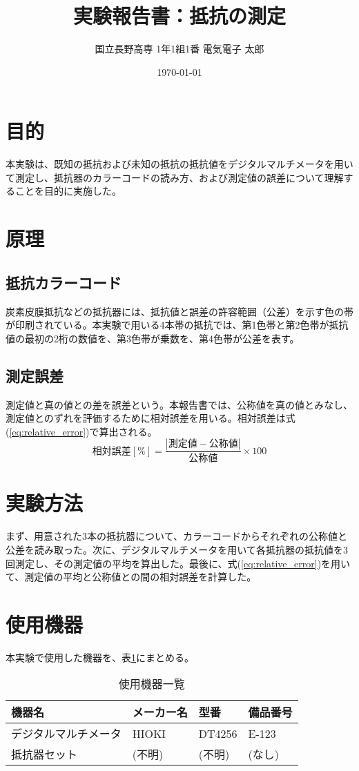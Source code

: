 \documentclass{ltjarticle}
\title{実験報告書：抵抗の測定}
\author{国立長野高専 1年1組1番 電気電子 太郎}
\date{\today}
\begin{document}
\maketitle
{} %

\section{目的}
本実験は、既知の抵抗および未知の抵抗の抵抗値をデジタルマルチメータを用いて測定し、抵抗器のカラーコードの読み方、および測定値の誤差について理解することを目的に実施した。

\section{原理}
\subsection{抵抗カラーコード}
炭素皮膜抵抗などの抵抗器には、抵抗値と誤差の許容範囲（公差）を示す色の帯が印刷されている。本実験で用いる4本帯の抵抗では、第1色帯と第2色帯が抵抗値の最初の2桁の数値を、第3色帯が乗数を、第4色帯が公差を表す。

\subsection{測定誤差}
測定値と真の値との差を誤差という。本報告書では、公称値を真の値とみなし、測定値とのずれを評価するために相対誤差を用いる。相対誤差は式(\ref{eq:relative_error})で算出される。
\begin{equation}
    \text{相対誤差} [\%] = \frac{|\text{測定値} - \text{公称値}|}{\text{公称値}} \times 100
    \label{eq:relative_error}
\end{equation}

\section{実験方法}
まず、用意された3本の抵抗器について、カラーコードからそれぞれの公称値と公差を読み取った。次に、デジタルマルチメータを用いて各抵抗器の抵抗値を3回測定し、その測定値の平均を算出した。最後に、式(\ref{eq:relative_error})を用いて、測定値の平均と公称値との間の相対誤差を計算した。

\section{使用機器}
本実験で使用した機器を、表\ref{tab:equipment}にまとめる。
\begin{table}[h]
    \centering
    \caption{使用機器一覧}
    \label{tab:equipment}
    \begin{tabular}{llll}
        \toprule
        機器名 & メーカー名 & 型番 & 備品番号 \\
        \midrule
        デジタルマルチメータ & HIOKI & DT4256 & E-123 \\
        抵抗器セット & (不明) & (不明) & (なし) \\
        \bottomrule
    \end{tabular}
\end{table}
\end{document}
